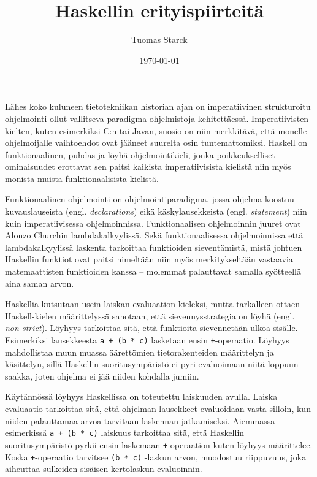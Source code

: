 \documentclass[finnish]{tktltiki2}
\title{Haskellin erityispiirteitä}
\author{Tuomas Starck}
\date{\today}
\newcommand{\code}[1]{\texttt{#1}}
\begin{document}
\maketitle
\mainmatter

%

Lähes koko kuluneen tietotekniikan historian ajan on imperatiivinen strukturoitu ohjelmointi ollut
vallitseva paradigma ohjelmistoja kehitettäessä. Imperatiivisten kielten, kuten esimerkiksi C:n tai
Javan, suosio on niin merkkitävä, että monelle ohjelmoijalle vaihtoehdot ovat jääneet suurelta osin
tuntemattomiksi. Haskell on funktionaalinen, puhdas ja löyhä ohjelmointikieli, jonka
poikkeukselliset ominaisuudet erottavat sen paitsi kaikista imperatiivisista kielistä niin myös
monista muista funktionaalisista kielistä.

Funktionaalinen ohjelmointi on ohjelmointiparadigma, jossa ohjelma koostuu kuvauslauseista (engl.
\emph{declarations}) eikä käskylausekkeista (engl. \emph{statement}) niin kuin imperatiivisessa
ohjelmoinnissa. Funktionaalisen ohjelmoinnin juuret ovat Alonzo Churchin lambdakalkyylissä. Sekä
funktionaalisessa ohjelmoinnissa että lambdakalkyylissä laskenta tarkoittaa funktioiden
sieventämistä, mistä johtuen Haskellin funktiot ovat paitsi nimeltään niin myös merkitykseltään
vastaavia matemaattisten funktioiden kanssa -- molemmat palauttavat samalla syötteellä aina saman
arvon.

%

Haskellia kutsutaan usein laiskan evaluaation kieleksi, mutta tarkalleen ottaen Haskell-kielen
määrittelyssä sanotaan, että sievennysstrategia on löyhä (engl. \emph{non-strict}). Löyhyys
tarkoittaa sitä, että funktioita sievennetään ulkoa sisälle. Esimerkiksi lausekkeesta \code{a + (b *
c)} lasketaan ensin \code{+}-operaatio. Löyhyys mahdollistaa muun muassa äärettömien
tietorakenteiden määrittelyn ja käsittelyn, sillä Haskellin suoritusympäristö ei pyri evaluoimaan
niitä loppuun saakka, joten ohjelma ei jää niiden kohdalla jumiin.

Käytännössä löyhyys Haskellissa on toteutettu laiskuuden avulla. Laiska evaluaatio tarkoittaa sitä,
että ohjelman lausekkeet evaluoidaan vasta silloin, kun niiden palauttamaa arvoa tarvitaan laskennan
jatkamiseksi. Aiemmassa esimerkissä \code{a + (b * c)} laiskuus tarkoittaa sitä, että Haskellin
suoritusympäristö pyrkii ensin laskemaan \code{+}-operaation kuten löyhyys määrittelee. Koska
\code{+}-operaatio tarvitsee \code{(b * c)} -laskun arvon, muodostuu riippuvuus, joka aiheuttaa
sulkeiden sisäisen kertolaskun evaluoinnin.
\end{document}
